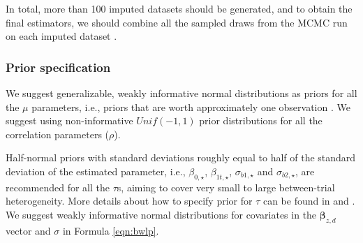 In total, more than 100 imputed datasets should be generated, and to obtain the final estimators, we should combine all the sampled draws from the \ac{MCMC} run on each imputed dataset \citep{zhou2010note}.

\subsubsection{Prior specification}
We suggest generalizable, weakly informative normal distributions as priors for all the $\mu$ parameters, i.e., priors that are worth approximately one observation \citep{kass1995reference}. We suggest using non-informative $Unif(-1,1)$ prior distributions for all the correlation parameters ($\rho$).

Half-normal priors with standard deviations roughly equal to half of the standard deviation of the estimated parameter, i.e., $\beta_{0,\star}$, $\beta_{1t, \star}$, $\sigma_{b1, \star}$ and $\sigma_{b2, \star}$, are recommended for all the $\tau$s, aiming to cover very small to large between-trial heterogeneity. More details about how to specify prior for $\tau$ can be found in \cite{spiegelhalter2004bayesian} and \cite{gelman2006prior}. We suggest weakly informative normal distributions for covariates in the $\boldsymbol{\beta}_{z,d}$ vector and $\sigma$ in Formula \ref{eqn:bwlp}. 


